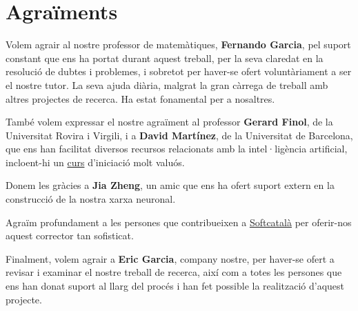 \chapter*{Agraïments}
Volem agrair al nostre professor de matemàtiques, \textbf{Fernando Garcia}, pel suport constant que ens ha portat durant aquest treball, per la seva claredat en la resolució de dubtes i problemes, i sobretot per haver-se ofert voluntàriament a ser el nostre tutor. La seva ajuda diària, malgrat la gran càrrega de treball amb altres projectes de recerca. Ha estat fonamental per a nosaltres.\par

També volem expressar el nostre agraïment al professor \textbf{Gerard Finol}, de la Universitat Rovira i Virgili, i a \textbf{David Martínez}, de la Universitat de Barcelona, que ens han facilitat diversos recursos relacionats amb la intel·ligència artificial, incloent-hi un \href{https://www.coursera.org/specializations/deep-learning#courses}{curs} d’iniciació molt valuós.

Donem les gràcies a \textbf{Jia Zheng}, un amic que ens ha ofert suport extern en la construcció de la nostra xarxa neuronal.\par

Agraïm profundament a les persones que contribueixen a \href{https://www.softcatala.org/corrector/}{Softcatalà} per oferir-nos aquest corrector tan sofisticat.

Finalment, volem agrair a \textbf{Eric Garcia}, company nostre, per haver-se ofert a revisar i examinar el nostre treball de recerca, així com a totes les persones que ens han donat suport al llarg del procés i han fet possible la realització d’aquest projecte.
